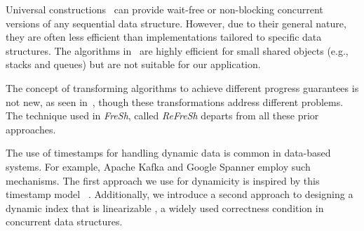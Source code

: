 Universal constructions~\cite{FK11spaa, FK12ppopp, FK14, FK17opodis, FK09, FK20,
FKK18, EF+16, FKK22} can provide wait-free or non-blocking concurrent versions of any
sequential data structure. However, due to their general nature, they are often less
efficient than implementations tailored to specific data structures. The algorithms
in~\cite{FK11spaa, FK14, FKK22} are highly efficient for small shared objects
(e.g., stacks and queues) but are not suitable for our application.
 
The concept of transforming algorithms to achieve different progress guarantees is not
new, as seen in~\cite{SP14, ELM05, GKK06}, though these transformations address different
problems. The technique used in \textit{FreSh}, called \textit{ReFreSh}  departs from all these
prior approaches.

The use of timestamps for handling dynamic data is common in data-based systems.
For example, Apache Kafka and Google Spanner employ such mechanisms.
The first approach we use for dynamicity is inspired by this timestamp model ~\cite{babcock2002}.
Additionally, we introduce a second approach to designing a dynamic index that is linearizable \cite{herlihyWingLinearizability},
 a widely used correctness condition in concurrent data structures.